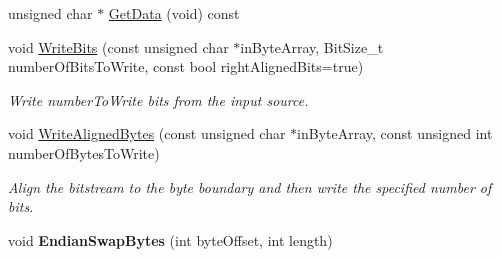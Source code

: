 \begin{DoxyCompactItemize}
\item 
unsigned char $\ast$ \hyperlink{class_rak_net_1_1_bit_stream_a2e201444796178e5074083b6d09bd221}{Get\-Data} (void) const 
\item 
void \hyperlink{class_rak_net_1_1_bit_stream_a6357c08afed23e2e857c418cbbb3a29a}{Write\-Bits} (const unsigned char $\ast$in\-Byte\-Array, Bit\-Size\-\_\-t number\-Of\-Bits\-To\-Write, const bool right\-Aligned\-Bits=true)
\begin{DoxyCompactList}\small\item\em Write number\-To\-Write bits from the input source. \end{DoxyCompactList}\item 
void \hyperlink{class_rak_net_1_1_bit_stream_abcd8b1c73408fc1e4e8088ca858c0f7a}{Write\-Aligned\-Bytes} (const unsigned char $\ast$in\-Byte\-Array, const unsigned int number\-Of\-Bytes\-To\-Write)
\begin{DoxyCompactList}\small\item\em Align the bitstream to the byte boundary and then write the specified number of bits. \end{DoxyCompactList}\item 
\hypertarget{class_rak_net_1_1_bit_stream_ac5910b8858e38d2eaba8ecff7aa6408b}{void {\bfseries Endian\-Swap\-Bytes} (int byte\-Offset, int length)}\label{class_rak_net_1_1_bit_stream_ac5910b8858e38d2eaba8ecff7aa6408b}


\end{DoxyCompactItemize}
